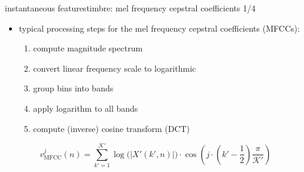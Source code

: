 		\begin{frame}{instantaneous features}{timbre: mel frequency cepstral coefficients 1/4}
            \begin{itemize}
                \item   typical processing steps for the mel frequency cepstral coefficients (MFCCs):
                    \begin{enumerate}
                        \item   compute magnitude spectrum
                        \item   convert linear frequency scale to logarithmic
                        \item   group bins into bands
                        \item   apply logarithm to all bands
                        \item   compute (inverse) cosine transform (DCT)
                    \end{enumerate}
            \end{itemize}
            
            \bigskip
			\begin{equation*}
				v^j_{\mathrm{MFCC}}(n)	= \sum\limits_{k' = 1}^{\mathcal{K}'}{\log\big( |X'(k',n)|\big)\cdot \cos\left( j\cdot\left(k'-\frac{1}{2} \right)\frac{\pi}{\mathcal{K}'} \right)}			
			\end{equation*}
        \end{frame}

